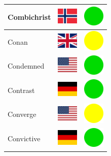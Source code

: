 \documentclass[12pt, a4paper, twoside]{report}
\begin{document}
\begin{center}
\begin{longtable}{|p{5cm}|p{2cm}|p{2cm}|}
Combichrist & \includegraphics[width=1cm]{4x3/no} & \includegraphics[width=1cm]{likes/y} \\ \hline
Conan & \includegraphics[width=1cm]{4x3/gb} & \includegraphics[width=1cm]{likes/m} \\ \hline
Condemned & \includegraphics[width=1cm]{4x3/us} & \includegraphics[width=1cm]{likes/y} \\ \hline
Contrast & \includegraphics[width=1cm]{4x3/de} & \includegraphics[width=1cm]{likes/y} \\ \hline
Converge & \includegraphics[width=1cm]{4x3/us} & \includegraphics[width=1cm]{likes/m} \\ \hline
Convictive & \includegraphics[width=1cm]{4x3/de} & \includegraphics[width=1cm]{likes/y} \\ \hline

\end{longtable}
\end{center}
\end{document}

